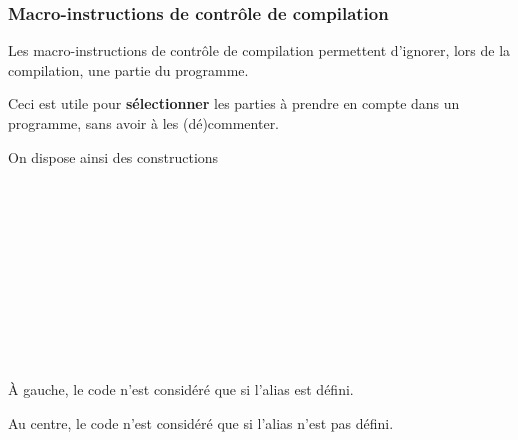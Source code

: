 \begin{frame} \frametitle{Macro-instructions de contrôle de compilation}
Les \alert{macro-instructions de contrôle de compilation} permettent 
d'ignorer, lors de la compilation, une partie du programme.
\medskip

Ceci est utile pour {\bf sélectionner} les parties à prendre en compte 
dans un programme, sans avoir à les (dé)commenter.
\bigskip

On dispose ainsi des constructions
\begin{multicols}{3}
 \\
\Code{\dots} \\
\bigskip
\bigskip

 \\
\Code{\dots} \\
\bigskip
\bigskip

 \\
\Code{\dots} \\
 \\
\Code{\dots} \\
\end{multicols}

À gauche, le code \Code{\dots} n'est considéré que si l'alias 
est défini.
\medskip

Au centre, le code \Code{\dots} n'est considéré que si l'alias 
n'est pas défini.
\end{frame}

